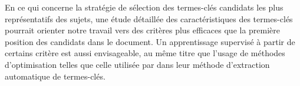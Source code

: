   En ce qui concerne la stratégie de sélection des termes-clés candidats les
  plus représentatifs des sujets, une étude détaillée des caractéristiques des
  termes-clés pourrait orienter notre travail vers des critères plus efficaces
  que la première position des candidats dans le document. Un apprentissage
  supervisé à partir de certains critère est aussi envisageable, au même titre
  que l'usage de méthodes d'optimisation telles que celle utilisée par
   dans leur méthode d'extraction
  automatique de termes-clés.

